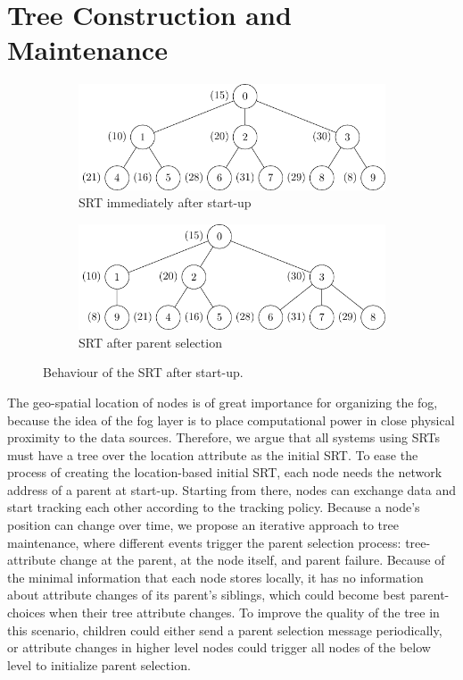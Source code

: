 \section{Tree Construction and Maintenance}\label{Tree Construction and Maintenance}  
  \begin{figure}[bh]         
    \centering
    \begin{subfigure}{0.8\textwidth}
      \centering
      \includegraphics[width=\textwidth]{img/specific-srts/startup/startup_1.pdf}      
      \caption{SRT immediately after start-up}
    \end{subfigure}
    \newline 
    \begin{subfigure}{0.8\textwidth}
      \centering
      \includegraphics[width=\textwidth]{img/specific-srts/startup/startup_2.pdf}
      \caption{SRT after parent selection}
    \end{subfigure}
    \caption{Behaviour of the SRT after start-up.}
    \label{fig:srt-startup}
  \end{figure}

  The geo-spatial location of nodes is of great importance for organizing the fog, because the idea of the fog layer is to place computational power in close physical proximity to the data sources. Therefore, we argue that all systems using SRTs must have a tree over the location attribute as the initial SRT. To ease the process of creating the location-based initial SRT, each node needs the network address of a parent at start-up. Starting from there, nodes can exchange data and start tracking each other according to the tracking policy. Because a node’s position can change over time, we propose an iterative approach to tree maintenance, where different events trigger the parent selection process: tree-attribute change  at the parent, at the node itself, and parent failure. Because of the minimal information that each node stores locally, it has no information about attribute changes of its parent's siblings, which could become best parent-choices when their tree attribute changes. To improve the quality of the tree in this scenario, children could either send a parent selection message periodically, or attribute changes in higher level nodes could trigger all nodes of the below level to initialize parent selection.
  
